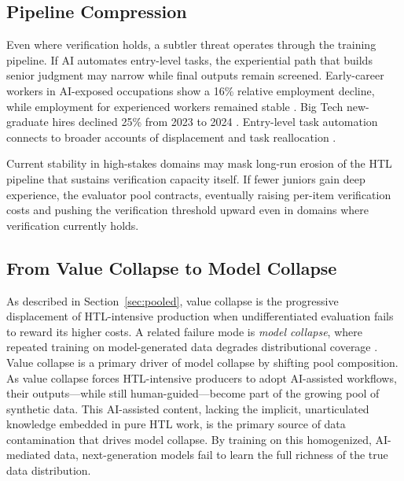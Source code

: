 \documentclass{article}
\theoremstyle{plain}
\theoremstyle{definition}
\theoremstyle{remark}
\begin{document}
\vspace{1pt}

\subsection{Pipeline Compression}
\label{sec:pipeline}

Even where verification holds, a subtler threat operates through the training pipeline. If AI automates entry-level tasks, the experiential path that builds senior judgment may narrow while final outputs remain screened. Early-career workers in AI-exposed occupations show a 16\% relative employment decline, while employment for experienced workers remained stable \citep{brynjolfsson2025canaries}. Big Tech new-graduate hires declined 25\% from 2023 to 2024 \citep{signalfire2025talent}. Entry-level task automation connects to broader accounts of displacement and task reallocation \citep{brynjolfsson2025canaries, hazra2025position, 10.1257/jep.33.2.3}.

Current stability in high-stakes domains may mask long-run erosion of the HTL pipeline that sustains verification capacity itself. If fewer juniors gain deep experience, the evaluator pool contracts, eventually raising per-item verification costs and pushing the verification threshold upward even in domains where verification currently holds.

\vspace{1pt}

\subsection{From Value Collapse to Model Collapse}
\label{sec:collapse}

\vspace{1pt}

As described in Section~\ref{sec:pooled}, value collapse is the progressive displacement of HTL-intensive production when undifferentiated evaluation fails to reward its higher costs. A related failure mode is \emph{model collapse}, where repeated training on model-generated data degrades distributional coverage \citep{shumailov2024curserecursiontraininggenerated, alemohammad2024selfconsuming, schaeffer2025positionmodelcollapsedoes}. Value collapse is a primary driver of model collapse by shifting pool composition. As value collapse forces HTL-intensive producers to adopt AI-assisted workflows, their outputs—while still human-guided—become part of the growing pool of synthetic data. This AI-assisted content, lacking the implicit, unarticulated knowledge embedded in pure HTL work, is the primary source of data contamination that drives model collapse. By training on this homogenized, AI-mediated data, next-generation models fail to learn the full richness of the true data distribution.
\end{document}
